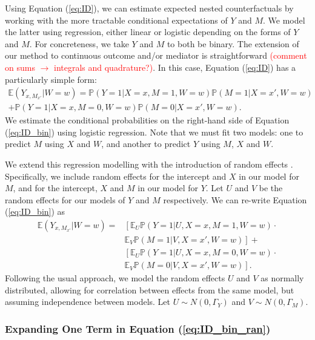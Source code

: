\documentclass{article}
\newcommand{\bP}{\mathbb{P}}
\newcommand{\bE}{\mathbb{E}}
\begin{document}
Using Equation (\ref{eq:ID}), we can estimate expected nested counterfactuals by working with the more tractable conditional expectations of $Y$ and $M$. We model the latter using regression, either linear or logistic depending on the forms of $Y$ and $M$. For concreteness, we take $Y$ and $M$ to both be binary. The extension of our method to continuous outcome and/or mediator is straightforward \textcolor{red}{(comment on sums $\rightarrow$ integrals and quadrature?)}. In this case, Equation (\ref{eq:ID}) has a particularly simple form:
%
\begin{multline}
    \bE (Y_{x, M_{x'}} | W=w) = \bP \left( Y=1 | X=x, M=1, W=w \right) \bP(M=1 | X = x', W=w) \\ + \bP \left( Y=1 | X=x, M=0, W=w \right) \bP(M=0 | X = x', W=w). \label{eq:ID_bin}
\end{multline}
%
We estimate the conditional probabilities on the right-hand side of Equation (\ref{eq:ID_bin}) using logistic regression. Note that we must fit two models: one to predict $M$ using $X$ and $W$, and another to predict $Y$ using $M$, $X$ and $W$.

We extend this regression modelling with the introduction of random effects \citep[see, e.g.][]{Dem04}. Specifically, we include random effects for the intercept and $X$ in our model for $M$, and for the intercept, $X$ and $M$ in our model for $Y$. Let $U$ and $V$ be the random effects for our models of $Y$ and $M$ respectively. We can re-write Equation (\ref{eq:ID_bin}) as
%
\begin{align}
    \bE (Y_{x, M_{x'}} | W=w) = & \left[\bE_U \bP \left( Y=1 |U, X=x, M=1, W=w \right) \right. \cdot \label{eq:ID_bin_ran}\\
    &  \left. \bE_V \bP(M=1 |V, X = x', W=w)\right] + \nonumber \\ 
    & \left[ \bE_U \bP \left( Y=1 |U, X=x, M=0, W=w \right) \right. \cdot \nonumber \\
    & \left. \bE_V \bP(M=0 |V, X = x', W=w) \right]. \nonumber 
\end{align}
%
Following the usual approach, we model the random effects $U$ and $V$ as normally distributed, allowing for correlation between effects from the same model, but assuming independence between models. Let $U \sim N(0, \Gamma_Y)$ and $V \sim N(0, \Gamma_M)$. 


\subsubsection{Expanding One Term in Equation (\ref{eq:ID_bin_ran})}
\end{document}
